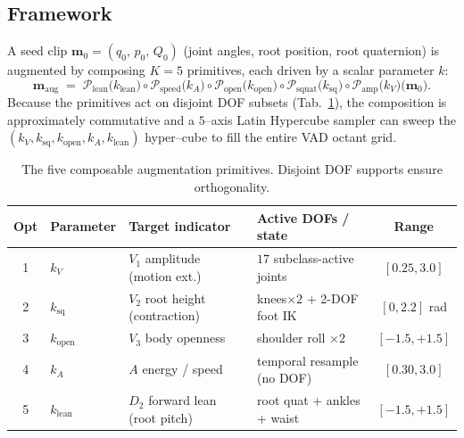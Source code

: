 \subsection{Framework}

A seed clip $\mathbf{m}_0 = (q_0,\,p_0,\,Q_0)$ (joint angles, root position,
root quaternion) is augmented by composing $K=5$ primitives, each driven
by a scalar parameter $k$:
\begin{equation}
  \mathbf{m}_{\text{aug}}
  \;=\; \mathcal{P}_{\text{lean}}\!\bigl(k_{\text{lean}}\bigr)\circ
        \mathcal{P}_{\text{speed}}\!\bigl(k_{A}\bigr)\circ
        \mathcal{P}_{\text{open}}\!\bigl(k_{\text{open}}\bigr)\circ
        \mathcal{P}_{\text{squat}}\!\bigl(k_{\text{sq}}\bigr)\circ
        \mathcal{P}_{\text{amp}}\!\bigl(k_{V}\bigr)\!\bigl(\mathbf{m}_0\bigr).
  \label{eq:aug-compose}
\end{equation}
Because the primitives act on disjoint DOF subsets
(Tab.~\ref{tab:aug-primitives}), the composition is approximately
commutative and a $5$--axis Latin Hypercube sampler can sweep the
$(k_V,k_{\text{sq}},k_{\text{open}},k_A,k_{\text{lean}})$ hyper--cube to
fill the entire VAD octant grid.

\begin{table}[t]
  \centering\small
  \begin{tabular}{@{}clllc@{}}
    \toprule
    Opt & Parameter & Target indicator & Active DOFs / state & Range \\
    \midrule
    1 & $k_V$            & $V_1$ amplitude (motion ext.)      & $17$ subclass-active joints      & $[0.25,3.0]$ \\
    2 & $k_{\text{sq}}$  & $V_2$ root height (contraction)    & knees$\times 2$ + 2-DOF foot IK  & $[0,2.2]$ rad \\
    3 & $k_{\text{open}}$& $V_3$ body openness                 & shoulder roll $\times 2$         & $[-1.5,+1.5]$ \\
    4 & $k_A$            & $A$ energy / speed                  & temporal resample (no DOF)        & $[0.30,3.0]$ \\
    5 & $k_{\text{lean}}$& $D_2$ forward lean (root pitch)     & root quat + ankles + waist       & $[-1.5,+1.5]$ \\
    \bottomrule
  \end{tabular}
  \caption{The five composable augmentation primitives. Disjoint DOF
           supports ensure orthogonality.}
  \label{tab:aug-primitives}
\end{table}

